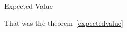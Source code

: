 \begin{theorem}\label{expectedvalue}
    Expected Value
\end{theorem}
That was the theorem~\ref*{expectedvalue}